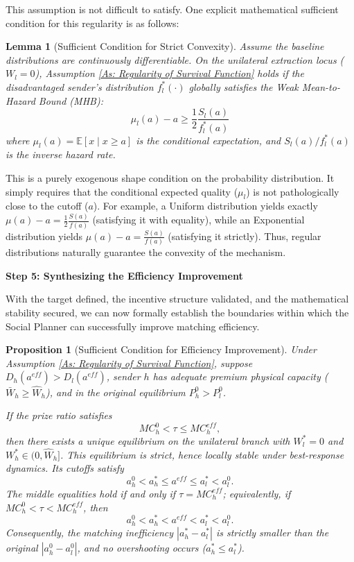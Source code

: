 \documentclass[12pt, a4paper]{article}
\newtheorem{lemma}{Lemma}
\newtheorem{proposition}{Proposition}
\begin{document}
This assumption is not difficult to satisfy. One explicit mathematical sufficient condition for this regularity is as follows:

\begin{lemma}[Sufficient Condition for Strict Convexity]
    \label{Lemma: Sufficient Condition for Convexity}
    Assume the baseline distributions are continuously differentiable. On the unilateral extraction locus ($W_l = 0$), Assumption \ref{As: Regularity of Survival Function} holds if the disadvantaged sender's distribution $f_l^*(\cdot)$ globally satisfies the Weak Mean-to-Hazard Bound (MHB):
    \[
        \mu_l(a) - a \ge \frac{1}{2} \frac{S_l(a)}{f_l^*(a)}
    \]
    where $\mu_l(a) = \mathbb{E}[x \mid x \ge a]$ is the conditional expectation, and $S_l(a) / f_l^*(a)$ is the inverse hazard rate. 
\end{lemma}

This is a purely exogenous shape condition on the probability distribution. It simply requires that the conditional expected quality ($\mu_l$) is not pathologically close to the cutoff ($a$). For example, a Uniform distribution yields exactly $\mu(a) - a = \frac{1}{2}\frac{S(a)}{f(a)}$ (satisfying it with equality), while an Exponential distribution yields $\mu(a) - a = \frac{S(a)}{f(a)}$ (satisfying it strictly). Thus, regular distributions naturally guarantee the convexity of the mechanism.

\textbf{Step 5: Synthesizing the Efficiency Improvement}

With the target defined, the incentive structure validated, and the mathematical stability secured, we can now formally establish the boundaries within which the Social Planner can successfully improve matching efficiency.

\begin{proposition}[Sufficient Condition for Efficiency Improvement]
    \label{prop: Efficiency Improvement}
    Under Assumption \ref{As: Regularity of Survival Function}, suppose $D_h(a^{eff}) > D_l(a^{eff})$, sender $h$ has adequate premium physical capacity ($\bar{W}_h \geq \hat{W}_h$), and in the original equilibrium $P_h^0 > P_l^0$. 
    
    If the prize ratio satisfies
    $$MC_h^0 < \tau \leq MC_h^{eff},$$
    then there exists a unique equilibrium on the unilateral branch with $W_l^* = 0$ and $W_h^* \in (0, \hat{W}_h]$. This equilibrium is strict, hence locally stable under best-response dynamics. Its cutoffs satisfy
    $$a_h^0 < a_h^* \leq a^{eff} \leq a_l^* < a_l^0.$$
    The middle equalities hold if and only if $\tau = MC_h^{eff}$; equivalently, if $MC_h^0 < \tau < MC_h^{eff}$, then
    $$a_h^0 < a_h^* < a^{eff} < a_l^* < a_l^0.$$
    Consequently, the matching inefficiency $|a_h^* - a_l^*|$ is strictly smaller than the original $|a_h^0 - a_l^0|$, and no overshooting occurs ($a_h^* \leq a_l^*$).
\end{proposition}
\end{document}
